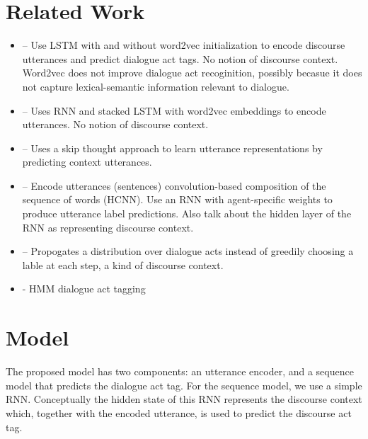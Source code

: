 \documentclass[11pt,a4paper]{article}
\begin{document}
\section{Related Work}
\begin{itemize}
  \item \cite{cerisaraEffectsUsingWord2vec2017} -- 
    Use LSTM with and without word2vec initialization to encode discourse utterances and predict dialogue act tags.
    No notion of discourse context.
    Word2vec does not improve dialogue act recoginition, possibly becasue it does not capture lexical-semantic information relevant to dialogue.

  \item \cite{khanpourDialogueActClassification} -- 
    Uses RNN and stacked LSTM with word2vec embeddings 
    to encode utterances.
    No notion of discourse context.

  \item \cite{pragstVectorRepresentationUtterances2018} --
    Uses a skip thought approach to learn utterance representations by predicting context utterances.

  \item \cite{kalchbrennerRecurrentConvolutionalNeural2013} --
    Encode utterances (sentences) convolution-based composition of the sequence of words (HCNN). 
    Use an RNN with agent-specific weights to produce utterance label predictions.
    Also talk about the hidden layer of the RNN as representing discourse context. 

  \item \cite{tranPreservingDistributionalInformation2017} --
    Propogates a distribution over dialogue acts instead of greedily choosing a lable at each step, 
    a kind of discourse context.

  \item \cite{stolckeDialogueActModeling2000} - 
    HMM dialogue act tagging

\end{itemize}

\section{Model}
The proposed model has two components: an utterance encoder, and a sequence model that predicts the dialogue act tag.
For the sequence model, we use a simple RNN.
Conceptually the hidden state of this RNN represents the discourse context which, 
together with the encoded utterance, is used to predict the discourse act tag.
\end{document}
